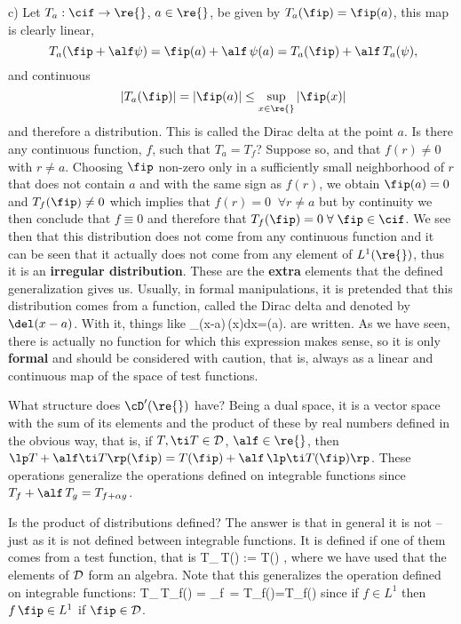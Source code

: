 \noi
c) Let $T_a:\cif\to\re{}$, $a\in\re{}$, be given by
$T_a(\fip)=\fip(a)$, this map is clearly linear,
$$
\;T_a(\fip+\alf\psi)=\fip(a)+\alf\,\psi(a)=T_a(\fip)+\alf\,T_a(\psi),
$$
 and continuous 
$$
 \; |T_a(\fip)|=|\fip(a)|\leq \sup_{x\in\re{}}|\fip(x)|
$$
  and therefore
a distribution. This is called the Dirac delta at the point $a$.
Is there any continuous function, $f$, such that $T_a=T_f$? Suppose
so, and that $f(r)\neq 0$ with $r\neq a$.
Choosing $\fip$ non-zero only in a sufficiently small neighborhood
of $r$ that does not contain $a$ and with the same sign as $f(r)$, we obtain $\fip(a)=0$ and
 $T_f(\fip)\neq 0$ which implies that $f(r)=0 \;\;\forall r\neq a$
 but by continuity we then conclude that $f\equiv 0$ and therefore that
 $T_f(\fip)=0\;\forall\;\fip\in\cif$. 
We see then that this distribution does not come from any
continuous function and it can be seen that it actually does not come from
any element of $L^1(\re{})$, thus it is an {\bf
irregular distribution}.  
These are the {\bf extra} elements that the defined generalization gives us.
Usually, in formal manipulations, it is pretended that this
distribution comes from a function, called the Dirac delta and
denoted by $\del(x-a)$. With it, things like
\beq
\int_{\re{}}\del(x-a)\,\fip(x)\;dx=\fip(a).
\eeq
are written.
As we have seen, there is actually no function for which 
this expression makes sense, so it is only {\bf formal} and should be considered with caution, that is, always as a linear and continuous map of the space of test functions.

What structure does ${\cD}'(\re{})$ have? Being a dual space,
it is a vector space with the sum of its elements and the product of these by
real numbers defined in the obvious way, that is, if $T,\ti
T\in \cal D$, $\alf\in\re{}$, then
$\lp T+\alf\ti T\rp(\fip)=T(\fip)+\alf\,\lp\ti T(\fip)\rp$. 
These 
operations generalize the operations defined on
integrable functions since $T_f+\alf \,T_g=T_{f + \alpha g}$.

Is the product of distributions defined? 
%
The answer is that in general it is not -- just as it is not defined between integrable functions. It is defined if one of them comes from a test function, that is
\beq
T_{\fip}\,\ti T(\psi) := \ti T(\fip\psi)  \;\;\forall \psi {},
\eeq
where we have used that the elements of $\cal D$ form an algebra. Note that this generalizes the operation defined on integrable functions:
\beq
T_{\fip}\,T_f(\psi) = \int_{\re{}}f\,\fip\psi\; = T_f(\fip\psi)=T_{\fip f}(\psi)
\eeq
since if $f\in L^1$ then $f\,\fip\in L^1$ if $\fip\in \cal D$.


